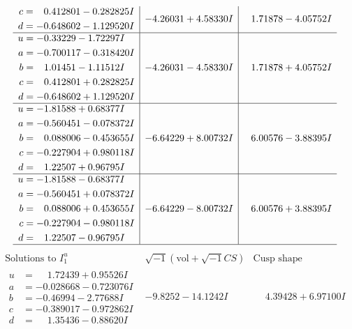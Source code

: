 \documentclass[1p]{elsarticle_modified}
\theoremstyle{definition}
\newcommand{\I}{\sqrt{-1}}
\begin{document}
$$\begin{array}{c|c|c}
\begin{aligned}
c &= \phantom{-}0.412801 - 0.282825 I \\
d &= -0.648602 - 1.129520 I\end{aligned}
 & -4.26031 + 4.58330 I & \phantom{-}1.71878 - 4.05752 I \\ \hline\begin{aligned}
u &= -0.33229 - 1.72297 I \\
a &= -0.700117 - 0.318420 I \\
b &= \phantom{-}1.01451 - 1.11512 I \\
c &= \phantom{-}0.412801 + 0.282825 I \\
d &= -0.648602 + 1.129520 I\end{aligned}
 & -4.26031 - 4.58330 I & \phantom{-}1.71878 + 4.05752 I \\ \hline\begin{aligned}
u &= -1.81588 + 0.68377 I \\
a &= -0.560451 - 0.078372 I \\
b &= \phantom{-}0.088006 - 0.453655 I \\
c &= -0.227904 + 0.980118 I \\
d &= \phantom{-}1.22507 + 0.96795 I\end{aligned}
 & -6.64229 + 8.00732 I & \phantom{-}6.00576 - 3.88395 I \\ \hline\begin{aligned}
u &= -1.81588 - 0.68377 I \\
a &= -0.560451 + 0.078372 I \\
b &= \phantom{-}0.088006 + 0.453655 I \\
c &= -0.227904 - 0.980118 I \\
d &= \phantom{-}1.22507 - 0.96795 I\end{aligned}
 & -6.64229 - 8.00732 I & \phantom{-}6.00576 + 3.88395 I\\
 \hline 
 \end{array}$$\newpage$$\begin{array}{c|c|c}  
\text{Solutions to }I^u_{1}& \I (\text{vol} + \sqrt{-1}CS) & \text{Cusp shape}\\
 \hline 
\begin{aligned}
u &= \phantom{-}1.72439 + 0.95526 I \\
a &= -0.028668 - 0.723076 I \\
b &= -0.46994 - 2.77688 I \\
c &= -0.389017 - 0.972862 I \\
d &= \phantom{-}1.35436 - 0.88620 I\end{aligned}
 & -9.8252 - 14.1242 I & \phantom{-}4.39428 + 6.97100 I \\ \hline\begin{aligned}

\end{aligned}
\end{array}$$
\end{document}
